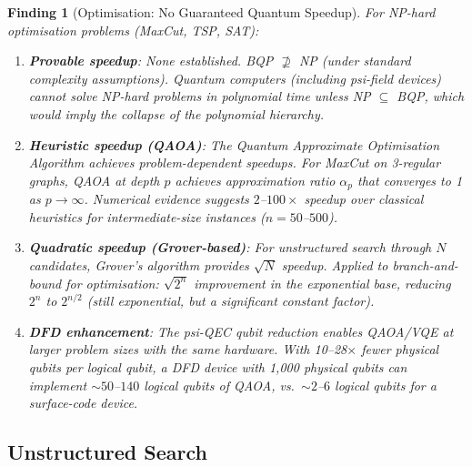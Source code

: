\documentclass[11pt]{article}
\newtheorem{finding}[theorem]{Finding}
\theoremstyle{definition}
\theoremstyle{remark}
\begin{document}
\begin{finding}[Optimisation: No Guaranteed Quantum Speedup]
\label{finding:optim-speedup}
For NP-hard optimisation problems (MaxCut, TSP, SAT):

\begin{enumerate}
  \item \textbf{Provable speedup}: None established. BQP $\not\supseteq$
    NP (under standard complexity assumptions). Quantum computers
    (including psi-field devices) cannot solve NP-hard problems in
    polynomial time unless NP $\subseteq$ BQP, which would imply
    the collapse of the polynomial hierarchy.

  \item \textbf{Heuristic speedup (QAOA)}: The Quantum Approximate
    Optimisation Algorithm achieves problem-dependent speedups.
    For MaxCut on 3-regular graphs, QAOA at depth $p$ achieves
    approximation ratio $\alpha_p$ that converges to 1 as
    $p \to \infty$. Numerical evidence suggests $2$--$100\times$
    speedup over classical heuristics for intermediate-size instances
    ($n = 50$--$500$).

  \item \textbf{Quadratic speedup (Grover-based)}: For unstructured
    search through $N$ candidates, Grover's algorithm provides
    $\sqrt{N}$ speedup. Applied to branch-and-bound for optimisation:
    $\sqrt{2^n}$ improvement in the exponential base, reducing
    $2^n$ to $2^{n/2}$ (still exponential, but a significant constant
    factor).

  \item \textbf{DFD enhancement}: The psi-QEC qubit reduction enables
    QAOA/VQE at larger problem sizes with the same hardware. With
    10--28$\times$ fewer physical qubits per logical qubit, a DFD
    device with 1{,}000 physical qubits can implement
    $\sim 50$--$140$ logical qubits of QAOA, vs.\ $\sim 2$--$6$
    logical qubits for a surface-code device.
\end{enumerate}
\end{finding}

\subsection{Unstructured Search}
\label{sec:search-speedup}
\end{document}
